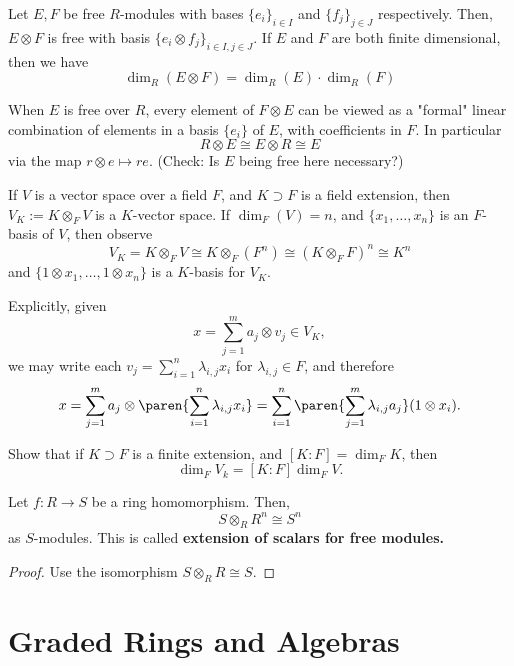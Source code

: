 \begin{cor}
    Let $E,F$ be free $R$-modules with bases $\{e_i\}_{i \in I}$ and $\{f_j\} _{j \in J}$ respectively. Then, $E \otimes F$ is free with basis $\{e_i \otimes f_j\}_{i\in I,j \in J}$. If $E$ and $F$ are both finite dimensional, then we have
    $$\dim _R(E \otimes F) = \dim _R(E) \cdot \dim_R(F)$$
\end{cor}

\begin{rmk}
    When $E$ is free over $R$, every element of $F \otimes E$ can be viewed as a "formal" linear combination of elements in a basis $\{e_i\}$ of $E$, with coefficients in $F$. In particular
    $$R \otimes E \cong E \otimes R \cong E$$
    via the map $r \otimes e \mapsto re$. (Check: Is $E$ being free here necessary?)
\end{rmk}

\begin{ex}
    If $V$ is a vector space over a field $F$, and $K \supset F$ is a field extension, then $V_K := K \otimes _F V$ is a $K$-vector space. If $\dim _F (V) =n$, and $\{x_1,\dots,x_n\}$ is an $F$-basis of $V$, then observe
    $$V_K = K \otimes _F V \cong K \otimes _F(F^n) \cong (K \otimes _F F)^n \cong K^n$$
    and $\{ 1\otimes x_1,\dots, 1 \otimes x_n\}$ is a $K$-basis for $V_K$.

    Explicitly, given
    $$x = \sum_{j=1}^m a_j \otimes v_j \in V_K,$$
    we may write each $v_j = \sum_{i=1}^n\lambda_{i,j}x_i$ for $\lambda_{i,j} \in F$, and therefore
    $$x = \sum_{j=1}^m a_j \otimes \paren{\sum_{i=1}^n\lambda_{i,j}x_i}= \sum_{i=1}^n \paren{\sum_{j=1}^m \lambda _{i,j} a_j}(1 \otimes x_i).$$
\end{ex}

\begin{notebox*}[Exercise]
    Show that if $K \supset F$ is a finite extension, and $[K:F] =\dim _FK$, then
    $$\dim _FV_k = [K:F]\dim _FV.$$
\end{notebox*}

\begin{cor}
    Let $f:R \to S$ be a ring homomorphism. Then,
    $$S \otimes _R R^n \cong S^n$$
    as $S$-modules. This is called \textbf{extension of scalars for free modules.}
\end{cor}

\begin{proof}
    Use the isomorphism $S\otimes _R R \cong S$.
\end{proof}

\section{Graded Rings and Algebras}

